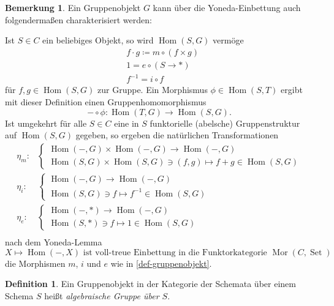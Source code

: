 \documentclass{amsart}
\theoremstyle{plain}
\theoremstyle{definition}
\newtheorem{definition}[subsection]{Definition}
\newtheorem{remark}[subsection]{Bemerkung}
\renewcommand{\hom}{\operatorname{Hom}}
\newcommand{\functorcat}{\operatorname{Mor}}
\begin{document}
\begin{remark}
	Ein Gruppenobjekt $G$ kann über die Yoneda-Einbettung auch folgendermaßen charakterisiert werden:

	\noindent Ist $S \in C$ ein beliebiges Objekt, so wird $\hom(S, G)$ vermöge
	\begin{align*}
		& f \cdot g \coloneqq m \circ (f \times g) \\
		& 1 = e \circ (S \rightarrow *) \\
		& f^{-1} = i \circ f
	\end{align*}
	für $f, g \in \hom(S, G)$ zur Gruppe. Ein Morphismus $\phi \in \hom(S, T)$ ergibt mit dieser Definition einen Gruppenhomomorphismus
	\begin{equation*}
		- \circ \phi \colon \hom(T, G) \rightarrow \hom(S, G).
	\end{equation*}
	Ist umgekehrt für alle $S \in C$ eine in $S$ funktorielle (abelsche) Gruppenstruktur auf $\hom(S, G)$ gegeben, so ergeben die natürlichen Transformationen
	\begin{align*}
		\eta_{m} \colon &
		\begin{cases}
			\hom(-, G) \times \hom(-, G) \rightarrow \hom(-, G) \\
			\hom(S, G) \times \hom(S, G) \ni (f, g) \mapsto f + g \in \hom(S, G)
		\end{cases} \\
		\eta_{i} \colon &
		\begin{cases}
			\hom(-, G) \rightarrow \hom(-, G) \\
			\hom(S, G) \ni f \mapsto f^{-1} \in \hom(S, G)
		\end{cases} \\
		\eta_{e} \colon &
		\begin{cases}
			\hom(-, *) \rightarrow \hom(-, G) \\
			\hom(S, *) \ni f \mapsto 1 \in \hom(S, G)
		\end{cases} \\
	\end{align*}
	nach dem Yoneda-Lemma 
	\begin{equation*}
		X \mapsto \hom(-, X) \text{ ist voll-treue Einbettung in die Funktorkategorie } \functorcat(C, \operatorname{Set})
	\end{equation*}
	die Morphismen $m$, $i$ und $e$ wie in \ref{def-gruppenobjekt}.
\end{remark}

\begin{definition}
	Ein Gruppenobjekt in der Kategorie der Schemata über einem Schema $S$ heißt {\it algebraische Gruppe über $S$}.
\end{definition}
\end{document}
